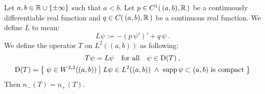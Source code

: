 \begin{thm}
    \label{thm-deficiency-diff-op}
    Let $a,b \in \mathbb{R} \cup \{ \pm\infty \}$ such that $a<b$. Let $p \in C^1( \, (a,b), \mathbb{R} \, )$ be a continuously differentiable real function and $q \in C( \, (a,b), \mathbb{R} \, )$ be a continuous real function. We define $L$ to mean:
    \begin{equation*}
        L \psi := -(p \, \psi')' + q \, \psi
        \: .
    \end{equation*}
    We define the operator $T$ on $L^2((a,b))$ as following:
    \begin{gather*}
        T \psi = L \psi
        \quad \text{for all} \quad
        \psi \in \mathrm{D}(T)
        \: ,
        \\
        \mathrm{D}(T) = \big\{\;
            \psi \in W^{2,2}((a,b))
            \;\big|\;
            L\psi \in L^2((a,b))
            \;\wedge\;
            \operatorname{supp} \psi \subset (a,b)
            \text{ is compact}
        \;\big\}
    \end{gather*}
    Then $n_-(T) = n_+(T)$.
\end{thm}




